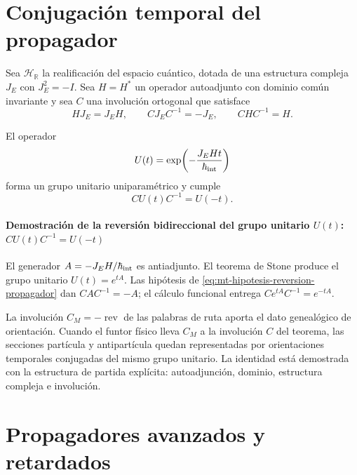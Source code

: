 \section{Conjugación temporal del propagador}

Sea $\mathcal H_{\mathbb R}$ la realificación del espacio cuántico, dotada
de una estructura compleja $J_E$ con $J_E^2=-I$. Sea $H=H^*$ un operador
autoadjunto con dominio común invariante y sea $C$ una involución ortogonal
que satisface
\begin{equation}
 HJ_E=J_EH,\qquad
 CJ_EC^{-1}=-J_E,
 \qquad CHC^{-1}=H.
 \label{eq:mt-hipotesis-reversion-propagador}
\end{equation}

\begin{resultado}[title={Teorema: Reversión bidireccional del grupo de evolución}]
\label{thm:mt-reversion-propagador}
El operador
\begin{equation}
 U(t)=\exp\!\left(-\frac{J_EHt}{\hbar_{\rm int}}\right)
 \label{eq:mt-grupo-evolucion}
\end{equation}
forma un grupo unitario uniparamétrico y cumple
\begin{equation}
 \boxed{CU(t)C^{-1}=U(-t)}.
 \label{eq:mt-reversion-unitaria}
\end{equation}
\end{resultado}

\paragraph{Demostración de la reversión bidireccional del grupo unitario \(U(t)\): \(CU(t)C^{-1}=U(-t)\)}
El generador $A=-J_EH/\hbar_{\rm int}$ es antiadjunto. El teorema de Stone
produce el grupo unitario $U(t)=e^{tA}$. Las hipótesis de
\eqref{eq:mt-hipotesis-reversion-propagador} dan $CAC^{-1}=-A$; el cálculo
funcional entrega $Ce^{tA}C^{-1}=e^{-tA}$.


La involución $C_M=-\operatorname{rev}$ de las palabras de ruta aporta el
dato genealógico de orientación. Cuando el funtor físico lleva $C_M$ a la
involución $C$ del teorema, las secciones partícula y antipartícula quedan
representadas por orientaciones temporales conjugadas del mismo grupo
unitario. La identidad está demostrada con la estructura de partida
explícita: autoadjunción, dominio, estructura compleja e involución.

\section{Propagadores avanzados y retardados}

